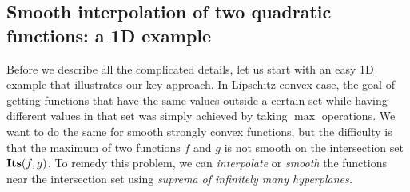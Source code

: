 \subsection{Smooth interpolation of two quadratic functions: a 1D example}
\label{sec:constsscvx-1dex}
Before we describe all the complicated details, let us start with an easy 
1D example that illustrates our key approach.
In Lipschitz convex case, the goal of getting functions that have the same values 
outside a certain set while having different values in that set was simply achieved by
taking $\max$ operations. 
We want to do the same for smooth strongly convex functions, 
but the difficulty is that the maximum of two functions $f$ and $g$ is not smooth on the intersection set $\mathbf{Its}({f},{g})$.
To remedy this problem, we can \emph{interpolate} or \emph{smooth} the functions near the intersection set using \emph{suprema of infinitely many hyperplanes.}

